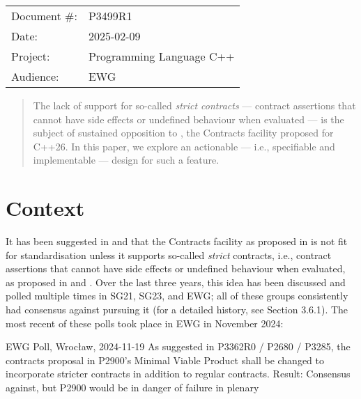 \begin{tabular}{ll}
Document \#: & P3499R1 \\
Date: &2025-02-09 \\
Project: & Programming Language C++ \\
Audience: & EWG
\end{tabular}

\begin{abstract}
The lack of support for so-called \emph{strict contracts} --- contract assertions that cannot have side effects or undefined behaviour when evaluated --- is the subject of sustained opposition to \cite{P2900R13}, the Contracts facility proposed for C++26. In this paper, we explore an actionable --- i.e., specifiable and implementable --- design for such a feature.
\end{abstract}







\section{Context}

It has been suggested in \cite{P3173R0} and \cite{P3362R0} that the Contracts facility as proposed in \cite{P2900R13} is not fit for standardisation unless it supports so-called \emph{strict} contracts, i.e., contract assertions that cannot have side effects or undefined behaviour when evaluated, as proposed in \cite{P2680R1} and \cite{P3285R0}. Over the last three years, this idea has been discussed and polled multiple times in SG21, SG23, and EWG; all of these groups consistently had consensus against pursuing it (for a detailed history, see \cite{P2899R0} Section 3.6.1). The most recent of these polls took place in EWG in November 2024:

\vspace{2mm}
\begin{wgpoll}{{EWG Poll, Wroc{\l}aw, 2024-11-19}}
As suggested in P3362R0 / P2680 / P3285, the contracts proposal in P2900’s Minimal Viable Product shall be changed to incorporate stricter contracts in addition to regular contracts.
Result: Consensus against, but P2900 would be in danger of failure in plenary
\end{wgpoll}
\vspace{2mm}

